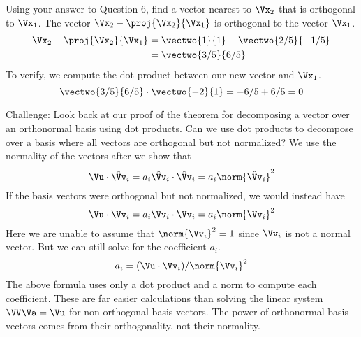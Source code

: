 \documentclass[12pt,ragged]{pajarticle}
\begin{document}
\begin{question}{11}{%
Using your answer to Question 6, find a vector nearest to $\Vx_2$ that is orthogonal to $\Vx_1$.}{
The vector $\Vx_2 - \proj{\Vx_2}{\Vx_1}$ is orthogonal to the vector $\Vx_1$.
\begin{align*}
	\Vx_2 - \proj{\Vx_2}{\Vx_1} &= \vectwo{1}{1} - \vectwo{2/5}{-1/5} \\
	&= \vectwo{3/5}{6/5}
\end{align*}
To verify, we compute the dot product between our new vector and $\Vx_1$.
\[ \vectwo{3/5}{6/5}\cdot\vectwo{-2}{1} = -6/5 + 6/5 = 0 \]
}
\end{question}

\begin{question}{12}{%
{\sc Challenge:} Look back at our proof of the theorem for decomposing a vector over an orthonormal basis using dot products. Can we use dot products to decompose over a basis where all vectors are orthogonal but not normalized?}{
We use the normality of the vectors after we show that
\[ \Vu\cdot\hat{\Vv}_i = a_i\hat{\Vv}_i\cdot\hat{\Vv}_i = a_i\norm{\hat{\Vv}_i}^2 \]
If the basis vectors were orthogonal but not normalized, we would instead have
\[ \Vu\cdot\Vv_i = a_i\Vv_i\cdot\Vv_i = a_i\norm{\Vv_i}^2 \]
Here we are unable to assume that $\norm{\Vv_i}^2 = 1$ since $\Vv_i$ is not a normal vector. But we can still solve for the coefficient $a_i$.
\[ a_i = (\Vu\cdot\Vv_i)/\norm{\Vv_i}^2 \]
The above formula uses only a dot product and a norm to compute each coefficient. These are far easier calculations than solving the linear system $\VV\Va = \Vu$ for non-orthogonal basis vectors. The power of orthonormal basis vectors comes from their orthogonality, not their normality.
}	
\end{question}
\end{document}
